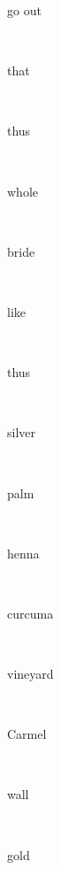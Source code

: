 \documentclass[a4paper]{article}
\begin{document}
\begin{multicols}{4}
\begin{multicols}{4}
\begin{multicols}{5}
{\hebrewfont{}} \begin{english}go out\end{english}\\
{\hebrewfont{}} \begin{english}that\end{english}\\
{\hebrewfont{}} \begin{english}thus\end{english}\\
{\hebrewfont{}} \begin{english}whole\end{english}\\
{\hebrewfont{}} \begin{english}bride\end{english}\\
{\hebrewfont{}} \begin{english}like\end{english}\\
{\hebrewfont{}} \begin{english}thus\end{english}\\
{\hebrewfont{}} \begin{english}silver\end{english}\\
{\hebrewfont{}} \begin{english}palm\end{english}\\
{\hebrewfont{}} \begin{english}henna\end{english}\\
{\hebrewfont{}} \begin{english}curcuma\end{english}\\
{\hebrewfont{}} \begin{english}vineyard\end{english}\\
{\hebrewfont{}} \begin{english}Carmel\end{english}\\
{\hebrewfont{}} \begin{english}wall\end{english}\\
{\hebrewfont{}} \begin{english}gold\end{english}\\

\end{multicols}
\end{multicols}
\end{multicols}
\end{document}
